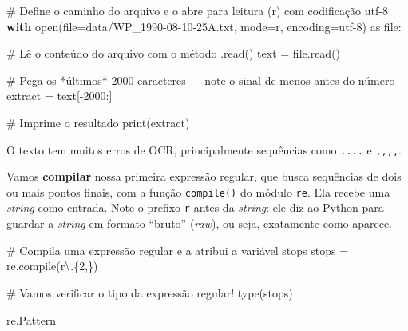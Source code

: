 \documentclass[
  brazilian,
  11pt,
]{article}
\newenvironment{Shaded}{\begin{snugshade}}{\end{snugshade}}
\newcommand{\BuiltInTok}[1]{\textcolor[rgb]{0.50,0.55,0.55}{#1}}
\newcommand{\CharTok}[1]{\textcolor[rgb]{0.24,0.68,0.91}{#1}}
\newcommand{\CommentTok}[1]{\textcolor[rgb]{0.48,0.49,0.49}{#1}}
\newcommand{\ControlFlowTok}[1]{\textcolor[rgb]{0.99,0.74,0.29}{\textbf{#1}}}
\newcommand{\DecValTok}[1]{\textcolor[rgb]{0.96,0.45,0.00}{#1}}
\newcommand{\ImportTok}[1]{\textcolor[rgb]{0.15,0.68,0.38}{#1}}
\newcommand{\NormalTok}[1]{\textcolor[rgb]{0.81,0.81,0.76}{#1}}
\newcommand{\OperatorTok}[1]{\textcolor[rgb]{0.81,0.81,0.76}{#1}}
\newcommand{\StringTok}[1]{\textcolor[rgb]{0.96,0.31,0.31}{#1}}
\newcommand{\VerbatimStringTok}[1]{\textcolor[rgb]{0.85,0.27,0.33}{#1}}
\let\oldtexttt\texttt
\renewcommand{\texttt}[1]{{\color{inlink}\oldtexttt{#1}}}
\begin{document}
\begin{Shaded}
\begin{Highlighting}[]
\CommentTok{\# Define o caminho do arquivo e o abre para leitura (r) com codificação utf{-}8}
\ControlFlowTok{with} \BuiltInTok{open}\NormalTok{(}\BuiltInTok{file}\OperatorTok{=}\StringTok{\textquotesingle{}data/WP\_1990{-}08{-}10{-}25A.txt\textquotesingle{}}\NormalTok{, mode}\OperatorTok{=}\StringTok{\textquotesingle{}r\textquotesingle{}}\NormalTok{, encoding}\OperatorTok{=}\StringTok{\textquotesingle{}utf{-}8\textquotesingle{}}\NormalTok{) }\ImportTok{as} \BuiltInTok{file}\NormalTok{:}

    \CommentTok{\# Lê o conteúdo do arquivo com o método .read()}
\NormalTok{    text }\OperatorTok{=} \BuiltInTok{file}\NormalTok{.read()}

\CommentTok{\# Pega os *últimos* 2000 caracteres — note o sinal de menos antes do número}
\NormalTok{extract }\OperatorTok{=}\NormalTok{ text[}\OperatorTok{{-}}\DecValTok{2000}\NormalTok{:]}

\CommentTok{\# Imprime o resultado}
\BuiltInTok{print}\NormalTok{(extract)}
\end{Highlighting}
\end{Shaded}

O texto tem muitos erros de OCR, principalmente sequências como
\texttt{....} e \texttt{,,,,}.

Vamos \textbf{compilar} nossa primeira expressão regular, que busca
sequências de dois ou mais pontos finais, com a função
\texttt{compile()} do módulo \texttt{re}. Ela recebe uma \emph{string}
como entrada. Note o prefixo \texttt{r} antes da \emph{string}: ele diz
ao Python para guardar a \emph{string} em formato ``bruto''
(\emph{raw}), ou seja, exatamente como aparece.

\begin{Shaded}
\begin{Highlighting}[]
\CommentTok{\# Compila uma expressão regular e a atribui a variável \textquotesingle{}stops\textquotesingle{}}
\NormalTok{stops }\OperatorTok{=}\NormalTok{ re.}\BuiltInTok{compile}\NormalTok{(}\VerbatimStringTok{r\textquotesingle{}}\CharTok{\textbackslash{}.}\OperatorTok{\{2,\}}\VerbatimStringTok{\textquotesingle{}}\NormalTok{)}

\CommentTok{\# Vamos verificar o tipo da expressão regular!}
\BuiltInTok{type}\NormalTok{(stops)}
\end{Highlighting}
\end{Shaded}

\begin{Shaded}
\begin{Highlighting}[]
\NormalTok{re.Pattern}
\end{Highlighting}
\end{Shaded}
\end{document}
